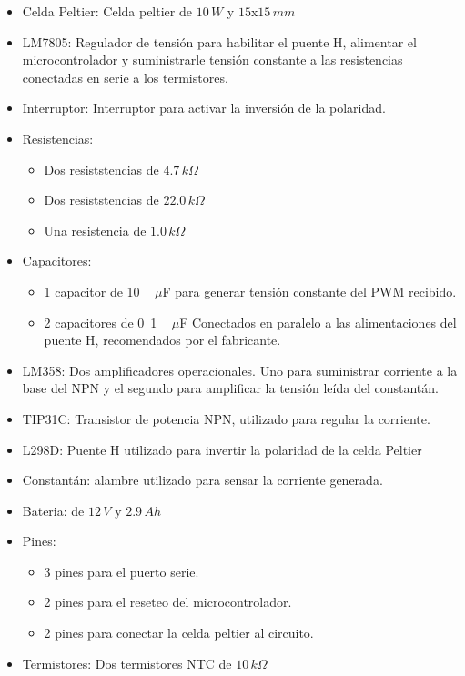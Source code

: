 \documentclass[10pt,spanish,a4paper,openany,notitlepage]{article}
\begin{document}
\begin{itemize}
\item{Celda Peltier:} Celda peltier de $10\, \unit{W}$ y $15$x$15\,\unit{mm}$ 
\item{LM7805:} Regulador de tensión para habilitar el puente H, alimentar
el microcontrolador y suministrarle tensión constante a las resistencias conectadas
en serie a los termistores.
\item{Interruptor:} Interruptor para activar la inversión de la polaridad.
\item{Resistencias:}
	\begin{itemize}
	\item Dos resiststencias de $4.7\,\unit{k\Omega}$
	\item Dos resiststencias de $22.0\,\unit{k\Omega}$
	\item Una resistencia de $1.0\,\unit{k\Omega}$
	\end{itemize}
\item{Capacitores:} 
	\begin{itemize}
	\item 1 capacitor de \unit{10\, \unit{$\mu$F}} para generar
	tensión constante del PWM recibido.
	\item 2 capacitores de \unit{0.1\, \unit{$\mu$F}} Conectados en paralelo
	a las alimentaciones del puente H, recomendados por el fabricante. 
	\end{itemize}
\item{LM358:} Dos amplificadores operacionales. Uno para suministrar corriente
a la base del NPN y el segundo para amplificar la tensión leída del constantán. 
\item{TIP31C:} Transistor de potencia NPN, utilizado para regular la corriente.
\item{L298D:} Puente H utilizado para invertir la polaridad de la celda Peltier
\item{Constantán:} alambre utilizado para sensar la corriente generada.
\item{Bateria:} de $12\, \unit{V}$ y $2.9\, \unit{Ah}$
\item{Pines:}
	\begin{itemize}
	\item 3 pines para el puerto serie.
	\item 2 pines para el reseteo del microcontrolador.
	\item 2 pines para conectar la celda peltier al circuito.
	\end{itemize}
\item{Termistores:} Dos termistores NTC de $10\, \unit{k\Omega}$
\end{itemize}
\end{document}
